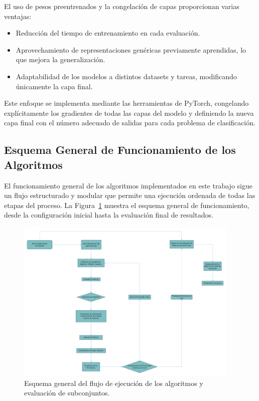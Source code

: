 El uso de pesos preentrenados y la congelación de capas proporcionan varias ventajas:
\begin{itemize}
      \item Reducción del tiempo de entrenamiento en cada evaluación.
      \item Aprovechamiento de representaciones genéricas previamente aprendidas, lo que mejora la generalización.
      \item Adaptabilidad de los modelos a distintos datasets y tareas, modificando únicamente la capa final.
\end{itemize}

Este enfoque se implementa mediante las herramientas de PyTorch,
congelando explícitamente los gradientes de todas las capas del modelo y definiendo la nueva capa final con el número adecuado de salidas para cada problema de clasificación.


\subsection{Esquema General de Funcionamiento de los Algoritmos}\label{subsec:esquema-algoritmos}
El funcionamiento general de los algoritmos implementados en este trabajo sigue un flujo estructurado y modular que permite una ejecución ordenada de todas las etapas del proceso.
La Figura~\ref{fig:esquema-flujo-algoritmos} muestra el esquema general de funcionamiento, desde la configuración inicial hasta la evaluación final de resultados.

\begin{figure}[htp]
      \centering
      \includegraphics[width=0.95\textwidth]{imagenes/flujo2.drawio}
      \caption{Esquema general del flujo de ejecución de los algoritmos y evaluación de subconjuntos.}
      \label{fig:esquema-flujo-algoritmos}
\end{figure}

